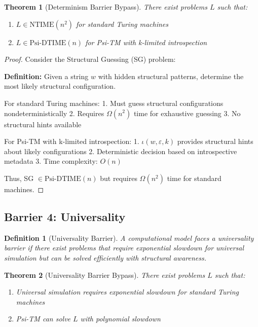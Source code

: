 \documentclass[11pt]{article}
\newtheorem{definition}{Definition}
\newtheorem{theorem}{Theorem}
\begin{document}
\begin{theorem}[Determinism Barrier Bypass]
There exist problems $L$ such that:
\begin{enumerate}
\item $L \in \text{NTIME}(n^2)$ for standard Turing machines
\item $L \in \text{Psi-DTIME}(n)$ for Psi-TM with k-limited introspection
\end{enumerate}
\end{theorem}

\begin{proof}
Consider the Structural Guessing (SG) problem:

\textbf{Definition:} Given a string $w$ with hidden structural patterns, determine the most likely structural configuration.

For standard Turing machines:
1. Must guess structural configurations nondeterministically
2. Requires $\Omega(n^2)$ time for exhaustive guessing
3. No structural hints available

For Psi-TM with k-limited introspection:
1. $\iota(w, \varepsilon, k)$ provides structural hints about likely configurations
2. Deterministic decision based on introspective metadata
3. Time complexity: $O(n)$

Thus, SG $\in \text{Psi-DTIME}(n)$ but requires $\Omega(n^2)$ time for standard machines.
\end{proof}

\subsection{Barrier 4: Universality}

\begin{definition}[Universality Barrier]
A computational model faces a universality barrier if there exist problems that require exponential slowdown for universal simulation but can be solved efficiently with structural awareness.
\end{definition}

\begin{theorem}[Universality Barrier Bypass]
There exist problems $L$ such that:
\begin{enumerate}
\item Universal simulation requires exponential slowdown for standard Turing machines
\item Psi-TM can solve $L$ with polynomial slowdown
\end{enumerate}
\end{theorem}
\end{document}
